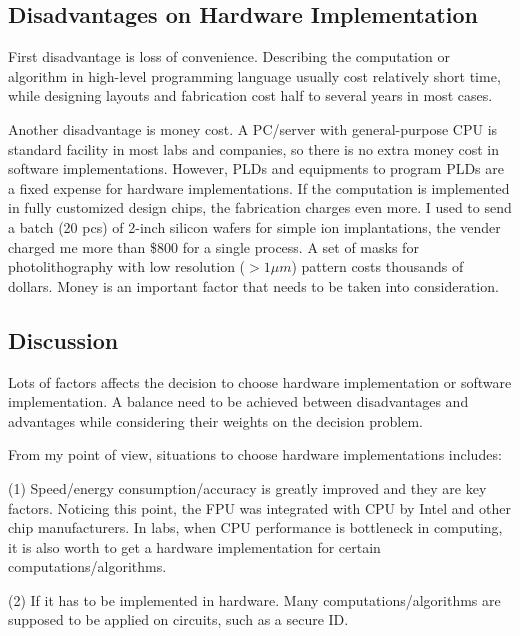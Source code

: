 \documentclass[11pt,twoside, onecolumn]{IEEEtran}
\begin{document}
\subsection{Disadvantages on Hardware Implementation}
First disadvantage is loss of convenience. Describing the computation or algorithm in high-level
programming language usually cost relatively short time, while designing layouts and fabrication
cost half to several years in most cases.

Another disadvantage is money cost. A PC/server with general-purpose CPU is standard facility in most labs and 
companies, so there is no extra money cost in software implementations. However, PLDs
and equipments to program PLDs are a fixed expense for hardware implementations. If
the computation is implemented in fully customized design chips, the fabrication charges even
more. I used to send a batch (20 pcs) of 2-inch silicon wafers for simple ion implantations,
the vender charged me more than \$800 for a single process. A set of masks for photolithography
with low resolution ($> 1 \mu m$) pattern costs thousands of dollars. Money is an important 
factor that needs to be taken into consideration.

\subsection{Discussion}
Lots of factors affects the decision to choose hardware implementation or software implementation. 
A balance need to be achieved between disadvantages and advantages while considering their weights
on the decision problem. 

From my point of view, situations to choose hardware implementations includes:\par
(1) Speed/energy consumption/accuracy is greatly improved and they are key factors.
Noticing this point, the FPU was integrated with CPU by Intel and other chip manufacturers.
In labs, when CPU performance is bottleneck in computing, it is also worth
to get a hardware implementation for certain computations/algorithms.\par
(2) If it has to be implemented in hardware. Many computations/algorithms are supposed to be
applied on circuits, such as a secure ID.
 
\end{document}
